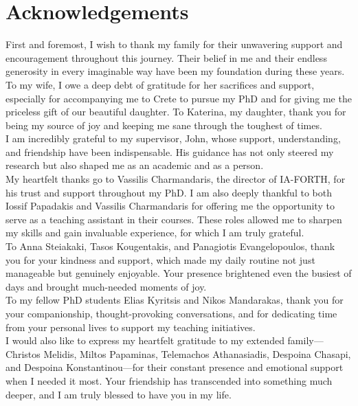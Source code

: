 \documentclass[main.tex]{subfiles}
\begin{document}
    \chapter*{Acknowledgements}
    First and foremost, I wish to thank my family for their unwavering support and encouragement throughout this journey. Their belief in me and their endless generosity in every imaginable way have been my foundation during these years.\\

    \noindent To my wife, I owe a deep debt of gratitude for her sacrifices and support, especially for accompanying me to Crete to pursue my PhD and for giving me the priceless gift of our beautiful daughter. To Katerina, my daughter, thank you for being my source of joy and keeping me sane through the toughest of times. \\

    \noindent I am incredibly grateful to my supervisor, John, whose support, understanding, and friendship have been indispensable. His guidance has not only steered my research but also shaped me as an academic and as a person.\\

    \noindent My heartfelt thanks go to Vassilis Charmandaris, the director of IA-FORTH, for his trust and support throughout my PhD. I am also deeply thankful to both Iossif Papadakis and Vassilis Charmandaris for offering me the opportunity to serve as a teaching assistant in their courses. These roles allowed me to sharpen my skills and gain invaluable experience, for which I am truly grateful. \\

    \noindent To Anna Steiakaki, Tasos Kougentakis, and Panagiotis Evangelopoulos, thank you for your kindness and support, which made my daily routine not just manageable but genuinely enjoyable. Your presence brightened even the busiest of days and brought much-needed moments of joy. \\

    \noindent To my fellow PhD students Elias Kyritsis and Nikos Mandarakas, thank you for your companionship, thought-provoking conversations, and for dedicating time from your personal lives to support my teaching initiatives. \\

    \noindent I would also like to express my heartfelt gratitude to my extended family---Christos Melidis, Miltos Papaminas, Telemachos Athanasiadis, Despoina Chasapi, and Despoina Konstantinou---for their constant presence and emotional support when I needed it most. Your friendship has transcended into something much deeper, and I am truly blessed to have you in my life. \\
\end{document}
